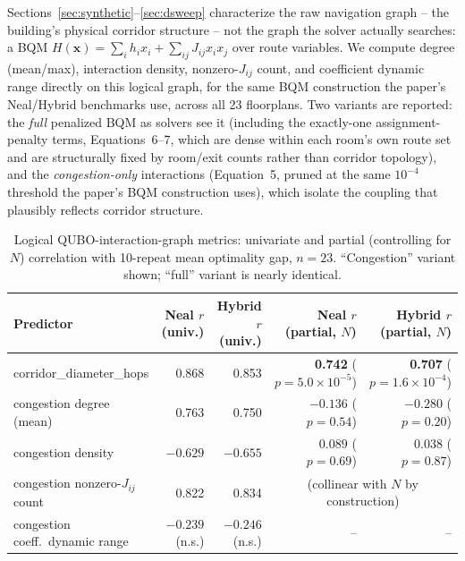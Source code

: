 \documentclass[11pt]{article}
\begin{document}
Sections~\ref{sec:synthetic}--\ref{sec:dsweep} characterize the raw navigation graph -- the building's physical corridor structure -- not the graph the solver actually searches: a BQM $H(\mathbf{x}) = \sum_i h_i x_i + \sum_{ij} J_{ij} x_i x_j$ over route variables. We compute degree (mean/max), interaction density, nonzero-$J_{ij}$ count, and coefficient dynamic range directly on this logical graph, for the same BQM construction the paper's Neal/Hybrid benchmarks use, across all 23 floorplans. Two variants are reported: the \emph{full} penalized BQM as solvers see it (including the exactly-one assignment-penalty terms, Equations~6--7, which are dense within each room's own route set and are structurally fixed by room/exit counts rather than corridor topology), and the \emph{congestion-only} interactions (Equation~5, pruned at the same $10^{-4}$ threshold the paper's BQM construction uses), which isolate the coupling that plausibly reflects corridor structure.

\begin{table}[h]
\centering
\caption{Logical QUBO-interaction-graph metrics: univariate and partial (controlling for $N$) correlation with 10-repeat mean optimality gap, $n=23$. ``Congestion'' variant shown; ``full'' variant is nearly identical.}
\label{tab:qubograph}
\small
\begin{tabular}{lrrrr}
\toprule
Predictor & Neal $r$ (univ.) & Hybrid $r$ (univ.) & Neal $r$ (partial, $N$) & Hybrid $r$ (partial, $N$) \\
\midrule
corridor\_diameter\_hops & 0.868 & 0.853 & \textbf{0.742} ($p=5.0\times10^{-5}$) & \textbf{0.707} ($p=1.6\times10^{-4}$) \\
congestion degree (mean) & 0.763 & 0.750 & $-0.136$ ($p=0.54$) & $-0.280$ ($p=0.20$) \\
congestion density & $-0.629$ & $-0.655$ & $0.089$ ($p=0.69$) & $0.038$ ($p=0.87$) \\
congestion nonzero-$J_{ij}$ count & 0.822 & 0.834 & \multicolumn{2}{c}{(collinear with $N$ by construction)} \\
congestion coeff.\ dynamic range & $-0.239$ (n.s.) & $-0.246$ (n.s.) & -- & -- \\
\bottomrule
\end{tabular}
\end{table}
\end{document}

